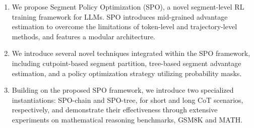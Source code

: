 \begin{enumerate}

\item We propose Segment Policy Optimization (SPO), a novel segment-level RL training framework for LLMs. SPO introduces mid-grained advantage estimation to overcome the limitations of token-level and trajectory-level methods, and features a modular architecture. 

\item We introduce several novel techniques integrated within the SPO framework, including cutpoint-based segment partition, tree-based segment advantage estimation, and a policy optimization strategy utilizing probability masks.

\item Building on the proposed SPO framework, we introduce two specialized instantiations: SPO-chain and SPO-tree, for short and long CoT scenarios, respectively, and demonstrate their effectiveness through extensive experiments on mathematical reasoning benchmarks, GSM8K and MATH. 

\end{enumerate}
